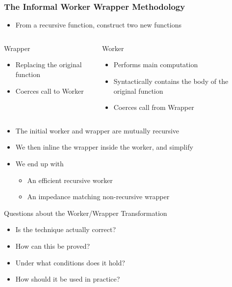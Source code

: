 \documentclass[smaller]{beamer}
\begin{document}
\begin{frame}
\frametitle{The Informal Worker Wrapper Methodology}

\begin{itemize}
\item From a recursive function, construct two new functions
\end{itemize}
{\small\begin{columns}[t] 
\begin{column}{0.4\textwidth}
\begin{block}{Wrapper}
\begin{itemize} 
\item Replacing the original function
\item Coerces call to Worker
\end{itemize} 
\end{block}
\end{column} 
\begin{column}{0.4\textwidth}
\begin{block}{Worker}
\begin{itemize}
\item Performs main computation
\item Syntactically contains the body of the original function
\item Coerces call from Wrapper
\end{itemize} 
\end{block}
\end{column} 
\end{columns}}

\begin{itemize}
\item The initial worker and wrapper are mutually recursive
\item We then inline the wrapper inside the worker, and simplify
\item We end up with 
\begin{itemize}
\item An efficient recursive worker
\item An impedance matching non-recursive wrapper
\end{itemize}
\end{itemize}
\end{frame}

\begin{frame}{Questions about the Worker/Wrapper Transformation}
\begin{itemize}
\item Is the technique actually correct? 
\item How can this be proved? 
\item Under what conditions does it hold? 
\item How should it be used in practice? 
\end{itemize}

\end{frame}
\end{document}
